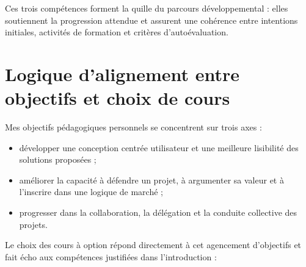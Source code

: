 Ces trois compétences forment la quille du parcours développemental : elles soutiennent la progression attendue et assurent une cohérence entre intentions initiales, activités de formation et critères d'autoévaluation.

\section{Logique d'alignement entre objectifs et choix de cours}

Mes objectifs pédagogiques personnels se concentrent sur trois axes :

\begin{itemize}
    \item développer une conception centrée utilisateur et une meilleure lisibilité des solutions proposées ;
    \item améliorer la capacité à défendre un projet, à argumenter sa valeur et à l'inscrire dans une logique de marché ;
    \item progresser dans la collaboration, la délégation et la conduite collective des projets.
\end{itemize}

Le choix des cours à option répond directement à cet agencement d'objectifs et fait écho aux compétences justifiées dans l'introduction :

